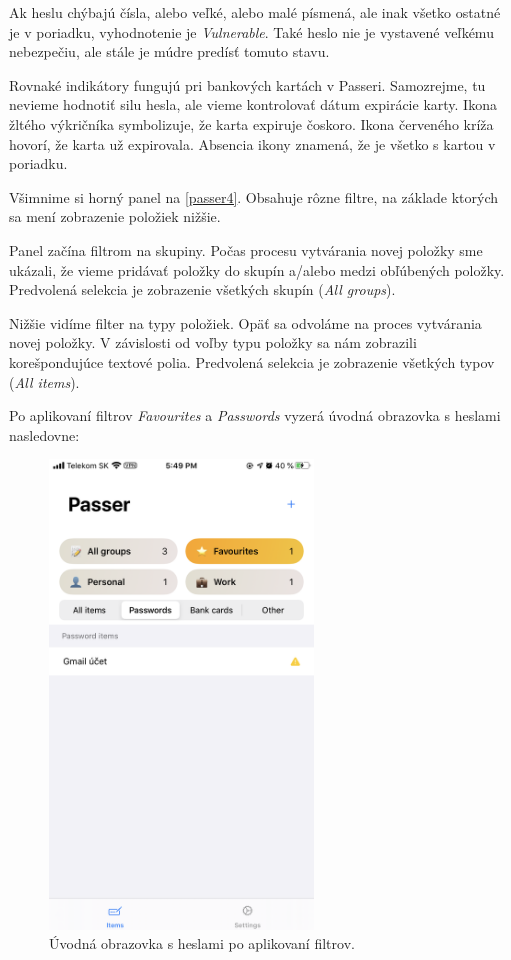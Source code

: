 Ak heslu chýbajú čísla, alebo veľké, alebo malé písmená, ale inak všetko ostatné je v poriadku, vyhodnotenie je \textit{Vulnerable}. Také heslo nie je vystavené veľkému nebezpečiu, ale stále je múdre predísť tomuto stavu.

Rovnaké indikátory fungujú pri bankových kartách v Passeri. Samozrejme, tu nevieme hodnotiť silu hesla, ale vieme kontrolovať dátum expirácie karty. Ikona žltého výkričníka symbolizuje, že karta expiruje čoskoro. Ikona červeného kríža hovorí, že karta už expirovala. Absencia ikony znamená, že je všetko s kartou v poriadku.

Všimnime si horný panel na \figurename{ \ref{passer4}}. Obsahuje rôzne filtre, na základe ktorých sa mení zobrazenie položiek nižšie. 

Panel začína filtrom na skupiny. Počas procesu vytvárania novej položky sme ukázali, že vieme pridávať položky do skupín a/alebo medzi obľúbených položky. Predvolená selekcia je zobrazenie všetkých skupín (\textit{All groups}).

Nižšie vidíme filter na typy položiek. Opäť sa odvoláme na proces vytvárania novej položky. V závislosti od voľby typu položky sa nám zobrazili korešpondujúce textové polia. Predvolená selekcia je zobrazenie všetkých typov (\textit{All items}).

Po aplikovaní filtrov \textit{Favourites} a \textit{Passwords} vyzerá úvodná obrazovka s heslami nasledovne:

\begin{figure}[H]
  \centering
  \includegraphics[width=7cm]{img/passer5.PNG}
  \caption{Úvodná obrazovka s heslami po aplikovaní filtrov.}
  \label{passer5}
\end{figure}

